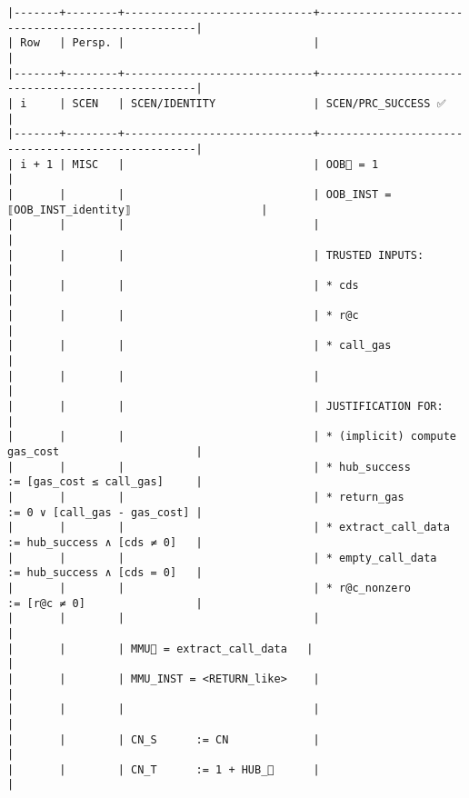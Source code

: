 \documentclass[varwidth=\maxdimen,margin=0.5cm,multi={verbatim}]{standalone}
\begin{document}
\begin{verbatim}
|-------+--------+-----------------------------+---------------------------------------------------|
| Row   | Persp. |                             |                                                   |
|-------+--------+-----------------------------+---------------------------------------------------|
| i     | SCEN   | SCEN/IDENTITY               | SCEN/PRC_SUCCESS ✅                               |
|-------+--------+-----------------------------+---------------------------------------------------|
| i + 1 | MISC   |                             | OOB🏴 = 1                                         |
|       |        |                             | OOB_INST = ⟦OOB_INST_identity⟧                    |
|       |        |                             |                                                   |
|       |        |                             | TRUSTED INPUTS:                                   |
|       |        |                             | * cds                                             |
|       |        |                             | * r@c                                             |
|       |        |                             | * call_gas                                        |
|       |        |                             |                                                   |
|       |        |                             | JUSTIFICATION FOR:                                |
|       |        |                             | * (implicit) compute gas_cost                     |
|       |        |                             | * hub_success        := [gas_cost ≤ call_gas]     |
|       |        |                             | * return_gas         := 0 ∨ [call_gas - gas_cost] |
|       |        |                             | * extract_call_data  := hub_success ∧ [cds ≠ 0]   |
|       |        |                             | * empty_call_data    := hub_success ∧ [cds = 0]   |
|       |        |                             | * r@c_nonzero        := [r@c ≠ 0]                 |
|       |        |                             |                                                   |
|       |        | MMU🏴 = extract_call_data   |                                                   |
|       |        | MMU_INST = <RETURN_like>    |                                                   |
|       |        |                             |                                                   |
|       |        | CN_S      := CN             |                                                   |
|       |        | CN_T      := 1 + HUB_      |                                                   |

\end{verbatim}
\end{document}
